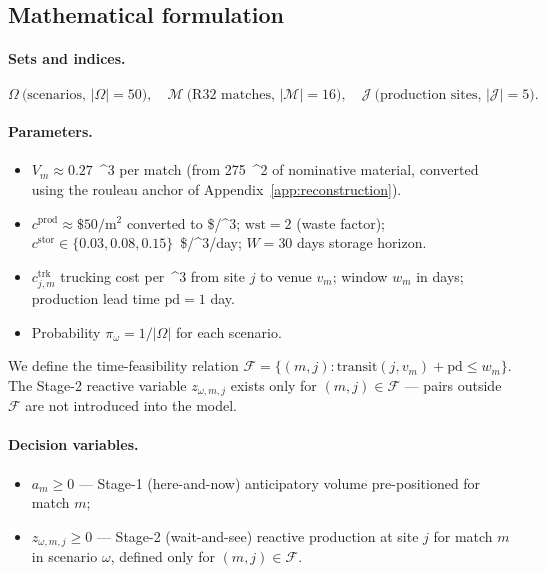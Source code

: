\documentclass[11pt,a4paper]{article}
\numberwithin{equation}{section}
\newcommand{\USD}[1]{\$#1}
\newcommand{\mcube}{\text{m}^{3}}
\newcommand{\msq}{\text{m}^{2}}
\begin{document}
\subsection{Mathematical formulation}\label{sec:partII:model}

\paragraph{Sets and indices.}
\[
\Omega\ \text{(scenarios, $|\Omega|=50$)},\quad
\mathcal{M}\ \text{(R32 matches, $|\mathcal{M}|=16$)},\quad
\mathcal{J}\ \text{(production sites, $|\mathcal{J}|=5$)}.
\]

\paragraph{Parameters.}
\begin{itemize}[leftmargin=*,itemsep=2pt,topsep=2pt]
\item $V_m \approx 0.27$~\mcube{} per match (from 275~\msq{} of nominative material, converted using the rouleau anchor of Appendix~\ref{app:reconstruction}).
\item $c^{\mathrm{prod}} \approx \USD{50}/\msq{}$ converted to \USD{}/\mcube{}; $\mathrm{wst} = 2$ (waste factor); $c^{\mathrm{stor}} \in \{0.03,0.08,0.15\}$~\USD{}/\mcube/day; $W = 30$ days storage horizon.
\item $c^{\mathrm{trk}}_{j,m}$ trucking cost per~\mcube{} from site $j$ to venue $v_m$; window $w_m$ in days; production lead time $\mathrm{pd} = 1$ day.
\item Probability $\pi_\omega = 1/|\Omega|$ for each scenario.
\end{itemize}
We define the time-feasibility relation $\mathcal{F} = \{(m,j) : \mathrm{transit}(j,v_m) + \mathrm{pd} \le w_m\}$. The Stage-2 reactive variable $z_{\omega,m,j}$ exists only for $(m,j) \in \mathcal{F}$ — pairs outside $\mathcal{F}$ are not introduced into the model.

\paragraph{Decision variables.}
\begin{itemize}[leftmargin=*,itemsep=2pt,topsep=2pt]
\item $a_m \ge 0$ — Stage-1 (here-and-now) anticipatory volume pre-positioned for match $m$;
\item $z_{\omega,m,j} \ge 0$ — Stage-2 (wait-and-see) reactive production at site $j$ for match $m$ in scenario $\omega$, defined only for $(m,j) \in \mathcal{F}$.
\end{itemize}
\end{document}
